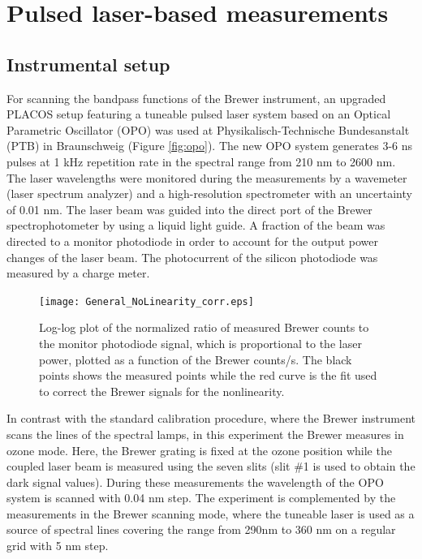 \documentclass[acp, manuscript]{copernicus}
\begin{document}
\section{ Pulsed laser-based measurements}

\subsection{Instrumental setup}

For scanning the bandpass functions of the Brewer instrument, an upgraded PLACOS setup \citep{Nevas2009} featuring a tuneable pulsed laser system based on an Optical Parametric Oscillator (OPO) was used at Physikalisch-Technische Bundesanstalt (PTB) in Braunschweig  (Figure \ref{fig:opo}). The new OPO system generates 3-6 ns pulses at 1 kHz repetition rate in the spectral range from 210 \unit{nm} to 2600 \unit{nm}. The laser wavelengths were monitored during the measurements by a wavemeter (laser spectrum analyzer) and a high-resolution spectrometer with an uncertainty of 0.01 nm. The laser beam was guided into the direct port of the Brewer spectrophotometer by using a liquid light guide. A fraction of the beam was directed to a monitor photodiode in order to account for the output power changes of the laser beam. The photocurrent of the silicon photodiode was measured by a charge meter.



\begin{figure}[t]
\texttt{[image: General\_NoLinearity\_corr.eps]}
\caption{ Log-log plot of the normalized ratio of measured Brewer counts to the monitor photodiode signal, which is proportional to the laser power, plotted as a function of the Brewer counts/s. The black points shows the measured points while the red curve is the fit used to correct the Brewer signals for the nonlinearity.}
\label{fig:no}
\end{figure}



In contrast with the standard calibration procedure, where the Brewer instrument scans the lines of the spectral lamps, in this experiment the Brewer measures in ozone mode. Here, the Brewer grating is fixed at the ozone position while the coupled laser beam is measured using the seven slits (slit  \#1 is used to obtain the dark signal values). During these measurements the wavelength of the OPO system is scanned with 0.04 \unit{nm} step. The experiment is complemented by the measurements in the Brewer scanning mode, where the tuneable laser is used as a source of spectral lines covering the range from 290\unit{nm} to 360 \unit{nm} on a regular grid with 5 \unit{nm} step.
\end{document}
